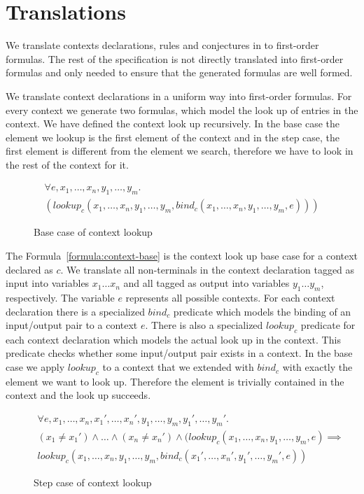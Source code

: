 \section{Translations}
\label{sec:translations}
We translate contexts declarations, rules and conjectures in to
first-order formulas. The rest of the specification is not directly
translated into first-order formulas and only needed to ensure that
the generated formulas are well formed.


We translate context declarations in a uniform way into first-order
formulas. For every context we generate two formulas, which model the
look up of entries in the context. We have defined the context look
up recursively. In the base case the element we lookup is the first
element of the context and in the step case, the first element is
different from the element we search, therefore we have to look in the
rest of the context for it.

\begin{figure}
\begin{multline}
  \forall e, x_1, \dots, x_n, y_1, \dots, y_m . \\
  (lookup_c(x_1,\dots,x_n,y_1,\dots,y_m,
  bind_c(x_1,\dots,x_n,y_1,\dots,y_m,e)))
\label{formula:context-base}
\end{multline}
\caption{Base case of context lookup}
\end{figure}

The Formula~\ref{formula:context-base} is the context look up base
case for a context declared as $c$. We translate all non-terminals in
the context declaration tagged as input into variables $x_1 \dots x_n$
and all tagged as output into variables $y_1 \dots y_m$,
respectively. The variable $e$ represents all possible contexts. For
each context declaration there is a specialized $bind_c$ predicate
which models the binding of an input/output pair to a context
$e$. There is also a specialized $lookup_c$ predicate for each context
declaration which models the actual look up in the context. This
predicate checks whether some input/output pair exists in a
context. In the base case we apply $lookup_c$ to a context that we
extended with $bind_c$ with exactly the element we want to look
up. Therefore the element is trivially contained in the context and
the look up succeeds.

\begin{figure}
\begin{multline}
  \forall e, x_1, \dots, x_n, x_1', \dots, x_n', y_1, \dots, y_m,
  y_1', \dots,
  y_m' . \\
  (x_1 \neq x_1') \land \dots \land (x_n \neq x_n') \land (lookup_c(x_1,
  \dots, x_n, y_1, \dots, y_m, e) \implies \\ lookup_c(x_1, \dots, x_n,
  y_1, \dots, y_m, bind_c(x_1',\dots,x_n',y_1',\dots,y_m',e))
\label{formula:context-step}
\end{multline}
\caption{Step case of context lookup}
\end{figure}

